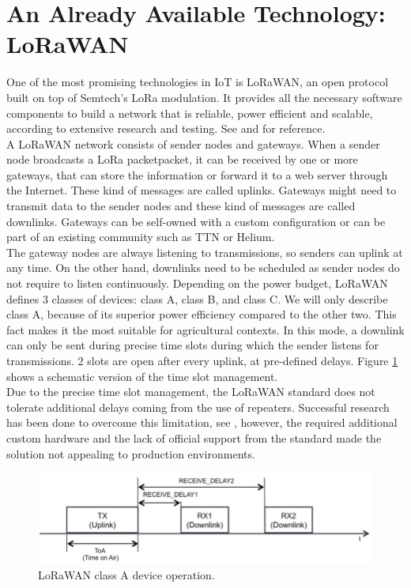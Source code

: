 \section{An Already Available Technology: LoRaWAN}
One of the most promising technologies in \gls{IoT} is \gls{LoRaWAN}, an open protocol built on top of
Semtech's LoRa modulation. It provides all the necessary software components to build a network
that is reliable, power efficient and scalable, according to extensive research and testing. See
\cite{lorawan_agriculture_1} and \cite{lorawan_agriculture_2} for reference.\\
A LoRaWAN network consists of sender nodes and gateways. When a sender node broadcasts a LoRa packetpacket, it can be
received by one or more gateways, that can store the information or forward it to a web server through the Internet.
These kind of messages are called uplinks. Gateways might need to transmit data to the sender nodes and these kind of messages
are called downlinks. Gateways can be self-owned with a custom configuration or can be part of an existing community
such as \gls{TTN} or Helium.\\
The gateway nodes are always listening to transmissions, so senders can uplink at any time. On the other hand, downlinks
need to be scheduled as sender nodes do not require to listen continuously. Depending on the power budget,
LoRaWAN defines 3 classes of devices: class A, class B, and class C. We will only describe class A, because of
its superior power efficiency compared to the other two. This fact makes it the most suitable for agricultural contexts.
In this mode, a downlink can only be sent during precise time slots during which the sender listens for transmissions.
2 slots are open after every uplink, at pre-defined delays. Figure \ref{img: lorawan class a} shows a schematic version
of the time slot management.\\
Due to the precise time slot management, the LoRaWAN standard does not tolerate additional delays coming from the
use of repeaters. Successful research has been done to overcome this limitation, see \cite{lorawan_range_extender},
however, the required additional custom hardware and the lack of official support from the standard made the solution not
appealing to production environments.

\begin{figure}[ht]
    \centering
    \includegraphics[width=\linewidth]{images/lorawan_class_a.png}
    \caption{LoRaWAN class A device operation.}
    \label{img: lorawan class a}
\end{figure}

